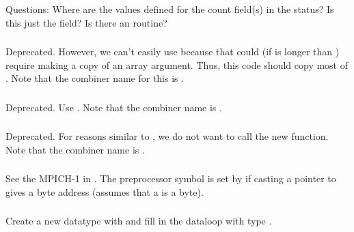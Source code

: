 \documentclass{article}
\begin{document}
\subsubsection{}
Questions: Where are the values defined for the count field(s) in the status?
Is this just the  field?  Is there an
 routine?

\subsubsection{}
Deprecated.  However, we can't easily use 
because that could (if  is longer than ) require
making a copy of an array argument.  Thus, this code should copy most
of .  Note that the combiner name for this
is .

\subsubsection{}
Deprecated.  Use .  Note that the combiner
name is .

\subsubsection{}
Deprecated.  For reasons similar to , we do
not want to call the new function.  Note that the combiner name is
. 

\subsubsection{}
See the MPICH-1  in .
The preprocessor symbol  is set by
 if casting a  pointer to 
gives a byte address (assumes that a  is a byte). 

\subsubsection{}
Create a new datatype with  and fill in the dataloop
with type .  
\end{document}
